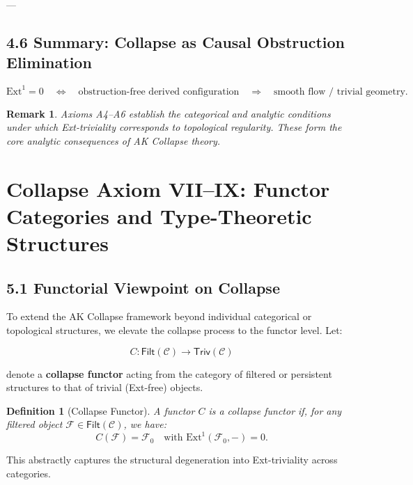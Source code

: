 \documentclass[11pt]{article}
\newtheorem{definition}[theorem]{Definition}
\newtheorem{remark}[theorem]{Remark}
\begin{document}
---

\subsection*{4.6 Summary: Collapse as Causal Obstruction Elimination}

\[
\mathrm{Ext}^1 = 0 
\quad \Longleftrightarrow \quad 
\text{obstruction-free derived configuration} 
\quad \Rightarrow \quad 
\text{smooth flow / trivial geometry}.
\]

\begin{remark}
Axioms A4–A6 establish the categorical and analytic conditions  
under which Ext-triviality corresponds to topological regularity.  
These form the core analytic consequences of AK Collapse theory.
\end{remark}



\section{Collapse Axiom VII–IX: Functor Categories and Type-Theoretic Structures}

\subsection*{5.1 Functorial Viewpoint on Collapse}

To extend the AK Collapse framework beyond individual categorical or topological structures,  
we elevate the collapse process to the functor level. Let:

\[
C: \mathsf{Filt}(\mathcal{C}) \longrightarrow \mathsf{Triv}(\mathcal{C})
\]

denote a \textbf{collapse functor} acting from the category of filtered or persistent structures to that of trivial (Ext-free) objects.

\begin{definition}[Collapse Functor]
A functor \( C \) is a collapse functor if, for any filtered object \( \mathcal{F} \in \mathsf{Filt}(\mathcal{C}) \), we have:
\[
C(\mathcal{F}) = \mathcal{F}_0 \quad \text{with } \mathrm{Ext}^1(\mathcal{F}_0, -) = 0.
\]
\end{definition}

This abstractly captures the structural degeneration into Ext-triviality across categories.
\end{document}
